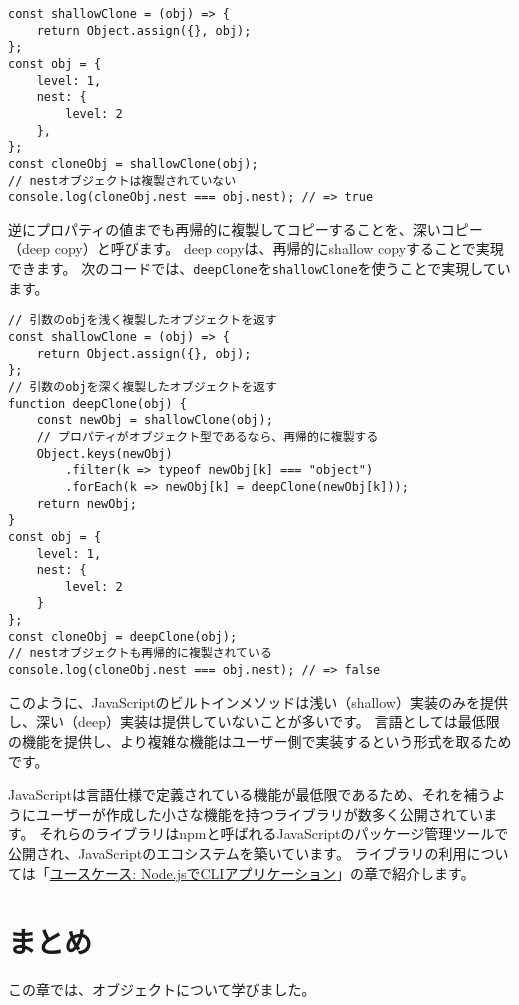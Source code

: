 \begin{lstlisting}
const shallowClone = (obj) => {
    return Object.assign({}, obj);
};
const obj = { 
    level: 1,
    nest: {
        level: 2
    },
};
const cloneObj = shallowClone(obj);
// nestオブジェクトは複製されていない
console.log(cloneObj.nest === obj.nest); // => true
\end{lstlisting}

逆にプロパティの値までも再帰的に複製してコピーすることを、深いコピー（deep
copy）と呼びます。 deep copyは、再帰的にshallow
copyすることで実現できます。
次のコードでは、\texttt{deepClone}を\texttt{shallowClone}を使うことで実現しています。

\begin{lstlisting}
// 引数のobjを浅く複製したオブジェクトを返す
const shallowClone = (obj) => {
    return Object.assign({}, obj);
};
// 引数のobjを深く複製したオブジェクトを返す
function deepClone(obj) {
    const newObj = shallowClone(obj);
    // プロパティがオブジェクト型であるなら、再帰的に複製する
    Object.keys(newObj)
        .filter(k => typeof newObj[k] === "object")
        .forEach(k => newObj[k] = deepClone(newObj[k]));
    return newObj;
}
const obj = { 
    level: 1,
    nest: {
        level: 2
    }
};
const cloneObj = deepClone(obj);
// nestオブジェクトも再帰的に複製されている
console.log(cloneObj.nest === obj.nest); // => false
\end{lstlisting}

このように、JavaScriptのビルトインメソッドは浅い（shallow）実装のみを提供し、深い（deep）実装は提供していないことが多いです。
言語としては最低限の機能を提供し、より複雑な機能はユーザー側で実装するという形式を取るためです。

JavaScriptは言語仕様で定義されている機能が最低限であるため、それを補うようにユーザーが作成した小さな機能を持つライブラリが数多く公開されています。
それらのライブラリはnpmと呼ばれるJavaScriptのパッケージ管理ツールで公開され、JavaScriptのエコシステムを築いています。
ライブラリの利用については「\hyperlink{node-cli}{ユースケース:
Node.jsでCLIアプリケーション}」の章で紹介します。

\hypertarget{conclusion}{%
\section{まとめ}\label{conclusion}}

この章では、オブジェクトについて学びました。

